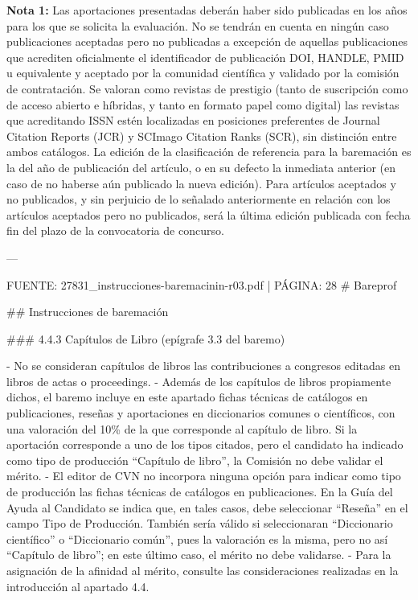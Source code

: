\documentclass{article}
\begin{document}
\begin{itemize}
\begin{itemize}
\begin{scriptsize}
                  \textbf{Nota 1:} Las aportaciones presentadas deberán haber sido publicadas en los años para los que se solicita la evaluación. No se tendrán en cuenta en ningún caso publicaciones aceptadas pero no publicadas a excepción de aquellas publicaciones que acrediten oficialmente el identificador de publicación DOI, HANDLE, PMID u equivalente y aceptado por la comunidad científica y validado por la comisión de contratación. Se valoran como revistas de prestigio (tanto de suscripción como de acceso abierto e híbridas, y tanto en formato papel como digital) las revistas que acreditando ISSN estén localizadas en posiciones preferentes de Journal Citation Reports (JCR) y SCImago Citation Ranks (SCR), sin distinción entre ambos catálogos. La edición de la clasificación de referencia para la baremación es la del año de publicación del artículo, o en su defecto la inmediata anterior (en caso de no haberse aún publicado la nueva edición). Para artículos aceptados y no publicados, y sin perjuicio de lo señalado anteriormente en relación con los artículos aceptados pero no publicados, será la última edición publicada con fecha fin del plazo de la convocatoria de concurso.

                  ---

                  FUENTE: 27831\_instrucciones-baremacinin-r03.pdf | PÁGINA: 28
                  \# Bareprof

                  \#\# Instrucciones de baremación

                  \#\#\# 4.4.3 Capítulos de Libro (epígrafe 3.3 del baremo)

                  - No se consideran capítulos de libros las contribuciones a congresos editadas en libros de actas o proceedings.
                  - Además de los capítulos de libros propiamente dichos, el baremo incluye en este apartado fichas técnicas de catálogos en publicaciones, reseñas y aportaciones en diccionarios comunes o científicos, con una valoración del 10\% de la que corresponde al capítulo de libro. Si la aportación corresponde a uno de los tipos citados, pero el candidato ha indicado como tipo de producción “Capítulo de libro”, la Comisión no debe validar el mérito.
                  - El editor de CVN no incorpora ninguna opción para indicar como tipo de producción las fichas técnicas de catálogos en publicaciones. En la Guía del Ayuda al Candidato se indica que, en tales casos, debe seleccionar “Reseña” en el campo Tipo de Producción. También sería válido si seleccionaran “Diccionario científico” o “Diccionario común”, pues la valoración es la misma, pero no así “Capítulo de libro”; en este último caso, el mérito no debe validarse.
                  - Para la asignación de la afinidad al mérito, consulte las consideraciones realizadas en la introducción al apartado 4.4.


\end{scriptsize}
\end{itemize}
\end{itemize}
\end{document}
